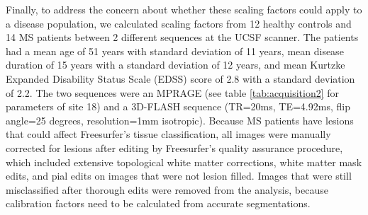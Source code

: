 Finally, to address the concern about whether these scaling factors could apply to a disease population, we calculated scaling factors from 12 healthy controls and 14 MS patients between 2 different sequences at the UCSF scanner. The patients had a mean age of 51 years with standard deviation of 11 years, mean disease duration of 15 years with a standard deviation of 12 years, and mean Kurtzke Expanded Disability Status Scale (EDSS) \cite{Kurtzke_1983} score of 2.8 with a standard deviation of 2.2. The two sequences were an MPRAGE (see table \ref{tab:acquisition2} for parameters of site 18) and a 3D-FLASH sequence (TR=20ms, TE=4.92ms, flip angle=25 degrees, resolution=1mm isotropic). Because MS patients have lesions that could affect Freesurfer's tissue classification, all images were manually corrected for lesions after editing by Freesurfer's quality assurance procedure, which included extensive topological white matter corrections, white matter mask edits, and pial edits on images that were not lesion filled. Images that were still misclassified after thorough edits were removed from the analysis, because calibration factors need to be calculated from accurate segmentations.